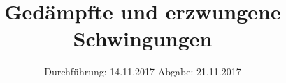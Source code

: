 
\subject{VERSUCH 354}
\title{Gedämpfte und erzwungene Schwingungen}
\date{%
  \hspace{-2.5em}
  Durchführung: 14.11.2017
  \hspace{4em}
  Abgabe: 21.11.2017
}


  \setlength{\parindent}{0em}
  \maketitle
  \thispagestyle{empty}
  \newpage
  \tableofcontents
  \newpage

  
  
  
  
\newpage
\printbibliography{}


